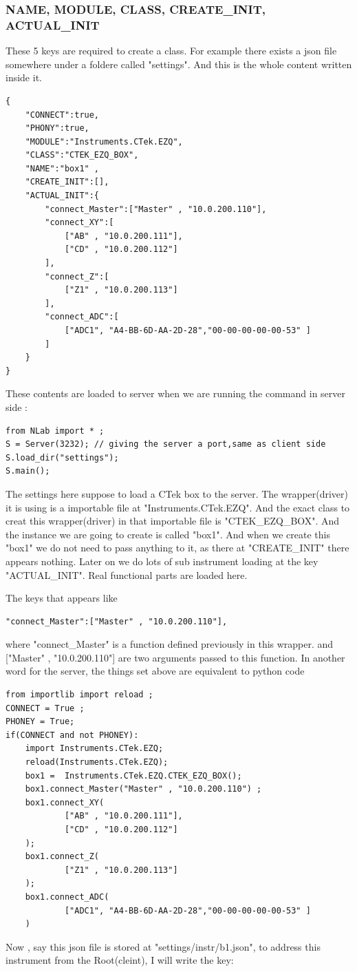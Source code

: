 \documentclass{article}
\begin{document}
\subsubsection{NAME, MODULE, CLASS, CREATE\_INIT, ACTUAL\_INIT}
These 5 keys are required to create a class. 
For example 
	there exists a json file somewhere under a foldere called "settings". 
And this is the whole content written inside it.
\begin{lstlisting}
{
	"CONNECT":true,
	"PHONY":true, 	
	"MODULE":"Instruments.CTek.EZQ",
	"CLASS":"CTEK_EZQ_BOX", 
	"NAME":"box1" ,
	"CREATE_INIT":[],
	"ACTUAL_INIT":{
		"connect_Master":["Master" , "10.0.200.110"], 
		"connect_XY":[
			["AB" , "10.0.200.111"], 
			["CD" , "10.0.200.112"]
		],
		"connect_Z":[
			["Z1" , "10.0.200.113"]
		],
		"connect_ADC":[
			["ADC1", "A4-BB-6D-AA-2D-28","00-00-00-00-00-53" ]
		]
	}  
}
\end{lstlisting}
These contents are loaded to server when we are running the command in server
side :


\begin{lstlisting}
from NLab import * ;
S = Server(3232); // giving the server a port,same as client side
S.load_dir("settings");
S.main();
\end{lstlisting}

The settings here suppose to load a CTek box to the server.
The wrapper(driver) it is using is a importable file at "Instruments.CTek.EZQ".
And the exact class to creat this wrapper(driver) in that importable file is 
"CTEK\_EZQ\_BOX".
And the instance we are going to create is called "box1".
And when we create this "box1" we do not need to pass anything to it, 
	as there at "CREATE\_INIT" there appears nothing.
Later on we do lots of sub instrument loading at the key "ACTUAL\_INIT".
Real functional parts are loaded here.

The keys that appears like 
\begin{lstlisting}
"connect_Master":["Master" , "10.0.200.110"], 
\end{lstlisting}
where "connect\_Master" is a function defined previously in this wrapper.
and ["Master" , "10.0.200.110"]  are two arguments passed to this function.
In another word for the server, the things set above are equivalent to python code

\begin{lstlisting}
from importlib import reload ;
CONNECT = True ;
PHONEY = True;
if(CONNECT and not PHONEY):
	import Instruments.CTek.EZQ;
	reload(Instruments.CTek.EZQ);
	box1 = 	Instruments.CTek.EZQ.CTEK_EZQ_BOX();
	box1.connect_Master("Master" , "10.0.200.110") ;  
	box1.connect_XY(
			["AB" , "10.0.200.111"], 
			["CD" , "10.0.200.112"]
	);
	box1.connect_Z(
			["Z1" , "10.0.200.113"]
	);
	box1.connect_ADC(
			["ADC1", "A4-BB-6D-AA-2D-28","00-00-00-00-00-53" ]
	) 
\end{lstlisting}
Now , say this json file is stored at "settings/instr/b1.json", to address this instrument from the Root(cleint), I will write the key:
\end{document}
